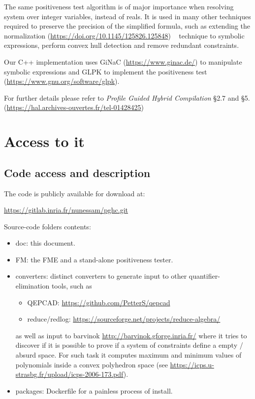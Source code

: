 \documentclass[12pt, a4paper]{report}
\begin{document}
The same positiveness test algorithm is of major importance when resolving system over integer variables, instead of reals. It is used in many other techniques required to preserve the precision of the simplified formula, such as extending the normalization (\url{https://doi.org/10.1145/125826.125848}) ~ technique to symbolic expressions, perform convex hull detection and remove redundant constraints.

Our C++ implementation uses GiNaC (\url{https://www.ginac.de/}) to manipulate symbolic expressions and GLPK to implement the positiveness test (\url{https://www.gnu.org/software/glpk}).


For further details please refer to \emph{Profile Guided Hybrid Compilation} \S2.7 and \S5. (\url{https://hal.archives-ouvertes.fr/tel-01428425})

\chapter{Access to it}
\section{Code access and description}
The code is publicly available for download at:

\url{https://gitlab.inria.fr/nunessam/pghc.git}

Source-code folders contents:
\begin{itemize}
	\item doc: this document.
	\item FM: the FME and a stand-alone positiveness tester.
	\item converters: distinct converters to generate input to other quantifier-elimination tools, such as
	\begin{itemize}
	\item QEPCAD: \url{https://github.com/PetterS/qepcad}
	\item reduce/redlog: \url{https://sourceforge.net/projects/reduce-algebra/}
	\end{itemize}
	as well as input to barvinok \url{http://barvinok.gforge.inria.fr/} where it tries to discover if it is possible to prove if a system of constraints define a empty / absurd space. For such task it computes maximum and minimum values of polynomials inside a convex polyhedron space (see \url{https://icps.u-strasbg.fr/upload/icps-2006-173.pdf}).
	\item packages: Dockerfile for a painless process of install.
\end{itemize}
\end{document}
